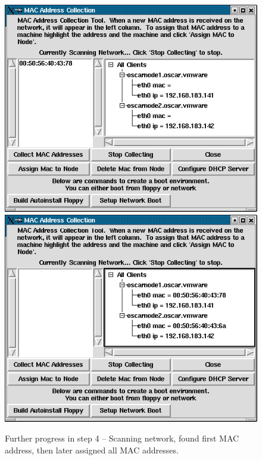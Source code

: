 \begin{figure}[h!]
  \begin{center}
    \centerline{
      \includegraphics[scale=\imgscale]{figs/6e_sbs-found-mac}
      \hspace{\imghskip}
      \includegraphics[scale=\imgscale]{figs/6f_sbs-stop-collect-mac2}
      }
    \caption[Further progress in step 4 -- Assigning MACs to
      IPs]{Further progress in step 4 -- Scanning network, found first
        MAC address, then later assigned all MAC addresses.}
    \label{fig:sbs-setup-network2}
  \end{center}
\end{figure}

